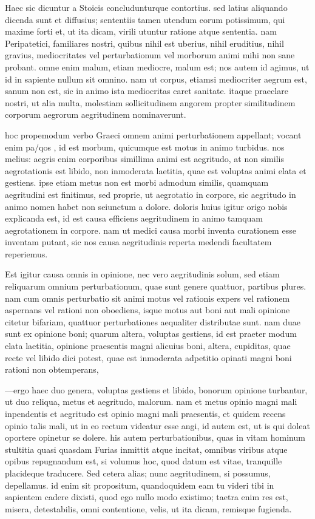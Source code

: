  Haec sic dicuntur a Stoicis concludunturque contortius. sed latius aliquando dicenda sunt et diffusius; sententiis tamen utendum eorum potissimum, qui maxime forti et, ut ita dicam, virili utuntur ratione atque sententia. nam Peripatetici, familiares nostri, quibus nihil est uberius, nihil eruditius, nihil gravius, mediocritates vel perturbationum vel morborum animi mihi non sane probant. omne enim malum, etiam mediocre, malum est; nos autem id agimus, ut id in sapiente nullum sit omnino. nam ut corpus, etiamsi mediocriter aegrum est, sanum non est, sic in animo ista mediocritas caret sanitate. itaque praeclare nostri, ut alia multa, molestiam sollicitudinem angorem propter similitudinem corporum aegrorum aegritudinem nominaverunt.

 hoc propemodum verbo Graeci omnem animi perturbationem appellant; vocant enim pa/qos , id est morbum, quicumque est motus in animo turbidus. nos melius: aegris enim corporibus simillima animi est aegritudo, at non similis aegrotationis est libido, non inmoderata laetitia, quae est voluptas animi elata et gestiens. ipse etiam metus non est morbi admodum similis, quamquam aegritudini est finitimus, sed proprie, ut aegrotatio in corpore, sic aegritudo in animo nomen habet non seiunctum a dolore. doloris huius igitur origo nobis explicanda est, id est causa efficiens aegritudinem in animo tamquam aegrotationem in corpore. nam ut medici causa morbi inventa curationem esse inventam putant, sic nos causa aegritudinis reperta medendi facultatem reperiemus.

 Est igitur causa omnis in opinione, nec vero aegritudinis solum, sed etiam reliquarum omnium perturbationum, quae sunt genere quattuor, partibus plures. nam cum omnis perturbatio sit animi motus vel rationis expers vel rationem aspernans vel rationi non oboediens, isque motus aut boni aut mali opinione citetur bifariam, quattuor perturbationes aequaliter distributae sunt. nam duae sunt ex opinione boni; quarum altera, voluptas gestiens, id est praeter modum elata laetitia, opinione praesentis magni alicuius boni, altera, cupiditas, quae recte vel libido dici potest, quae est inmoderata adpetitio opinati magni boni rationi non obtemperans,

 —ergo haec duo genera, voluptas gestiens et libido, bonorum opinione turbantur, ut duo reliqua, metus et aegritudo, malorum. nam et metus opinio magni mali inpendentis et aegritudo est opinio magni mali praesentis, et quidem recens opinio talis mali, ut in eo rectum videatur esse angi, id autem est, ut is qui doleat oportere opinetur se dolere. his autem perturbationibus, quas in vitam hominum stultitia quasi quasdam Furias inmittit atque incitat, omnibus viribus atque opibus repugnandum est, si volumus hoc, quod datum est vitae, tranquille placideque traducere. Sed cetera alias; nunc aegritudinem, si possumus, depellamus. id enim sit propositum, quandoquidem eam tu videri tibi in sapientem cadere dixisti, quod ego nullo modo existimo; taetra enim res est, misera, detestabilis, omni contentione, velis, ut ita dicam, remisque fugienda.

